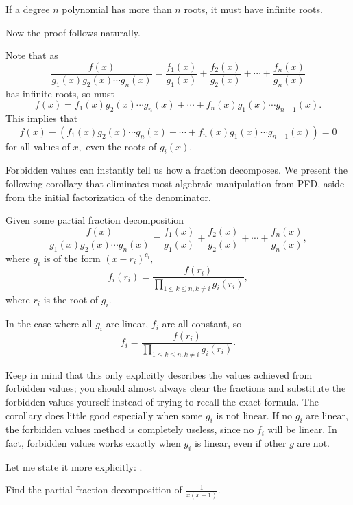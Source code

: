 \documentclass[mast]{lucky}
\begin{document}
\begin{theo}
If a degree $n$ polynomial has more than $n$ roots, it must have infinite roots.
\end{theo}

Now the proof follows naturally.

\begin{pro}
Note that as
\[\frac{f(x)}{g_1(x)g_2(x)\cdots g_n(x)}=\frac{f_1(x)}{g_1(x)}+\frac{f_2(x)}{g_2(x)}+\cdots+\frac{f_n(x)}{g_n(x)}\]
has infinite roots, so must 
\[f(x)=f_1(x)g_2(x)\cdots g_n(x)+\cdots+f_n(x)g_1(x)\cdots g_{n-1}(x).\]
This implies that
\[f(x)-(f_1(x)g_2(x)\cdots g_n(x)+\cdots+f_n(x)g_1(x)\cdots g_{n-1}(x))=0\]
for all values of $x,$ even the roots of $g_i(x).$
\end{pro}

Forbidden values can instantly tell us how a fraction decomposes. We present the following corollary that eliminates most algebraic manipulation from PFD, aside from the initial factorization of the denominator.

\begin{corollary}
Given some partial fraction decomposition
\[\frac{f(x)}{g_1(x)g_2(x)\cdots g_n(x)}=\frac{f_1(x)}{g_1(x)}+\frac{f_2(x)}{g_2(x)}+\cdots+\frac{f_n(x)}{g_n(x)},\] where $g_i$ is of the form $(x-r_i)^{c_i},$
\[f_i(r_i)=\frac{f(r_i)}{\prod\limits_{1\leq k\leq n, k\neq i}g_i(r_i)},\] where $r_i$ is the root of $g_i.$

In the case where all $g_i$ are linear, $f_i$ are all constant, so \[f_i=\frac{f(r_i)}{\prod\limits_{1\leq k\leq n,k\neq i}g_i(r_i)}.\]
\end{corollary}

Keep in mind that this only explicitly describes the values achieved from forbidden values; you should almost always clear the fractions and substitute the forbidden values yourself instead of trying to recall the exact formula. The corollary does little good especially when some $g_i$ is not linear. If no $g_i$ are linear, the forbidden values method is completely useless, since no $f_i$ will be linear. In fact, forbidden values works exactly when $g_i$ is linear, even if other $g$ are not.

Let me state it more explicitly: .

\begin{exam}
Find the partial fraction decomposition of $\frac{1}{x(x+1)}.$
\end{exam}
\end{document}
